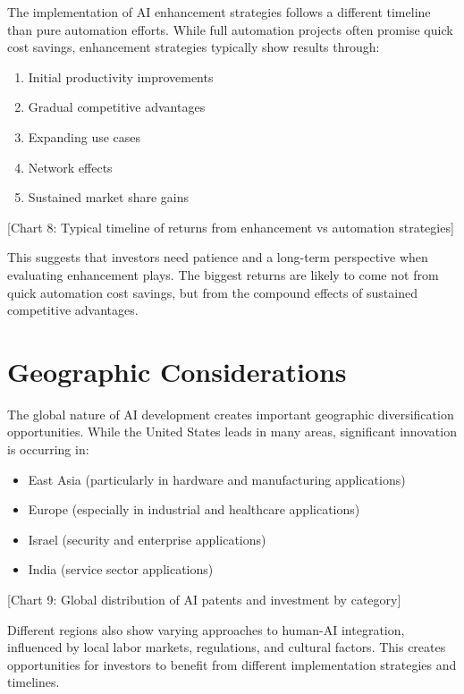 \documentclass[
  Letterpaper,
]{scrbook}
\providecommand{\tightlist}{%
  \setlength{\itemsep}{0pt}\setlength{\parskip}{0pt}}\usepackage{longtable,booktabs,array}
\begin{document}
The implementation of AI enhancement strategies follows a different
timeline than pure automation efforts. While full automation projects
often promise quick cost savings, enhancement strategies typically show
results through:

\begin{enumerate}
\def\labelenumi{\arabic{enumi}.}
\tightlist
\item
  Initial productivity improvements
\item
  Gradual competitive advantages
\item
  Expanding use cases
\item
  Network effects
\item
  Sustained market share gains
\end{enumerate}

{[}Chart 8: Typical timeline of returns from enhancement vs automation
strategies{]}

This suggests that investors need patience and a long-term perspective
when evaluating enhancement plays. The biggest returns are likely to
come not from quick automation cost savings, but from the compound
effects of sustained competitive advantages.

\section{Geographic Considerations}\label{geographic-considerations}

The global nature of AI development creates important geographic
diversification opportunities. While the United States leads in many
areas, significant innovation is occurring in:

\begin{itemize}
\tightlist
\item
  East Asia (particularly in hardware and manufacturing applications)
\item
  Europe (especially in industrial and healthcare applications)
\item
  Israel (security and enterprise applications)
\item
  India (service sector applications)
\end{itemize}

{[}Chart 9: Global distribution of AI patents and investment by
category{]}

Different regions also show varying approaches to human-AI integration,
influenced by local labor markets, regulations, and cultural factors.
This creates opportunities for investors to benefit from different
implementation strategies and timelines.
\end{document}
